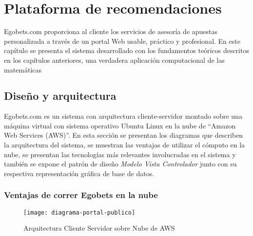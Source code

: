 \chapter{Plataforma de recomendaciones}
\label{chap:software}
\graphicspath{{/Users/brunomedina/Dropbox/Tesis-Egobets/egobets-notas/resources/diagramas/}}

Egobets.com proporciona al cliente los servicios de asesoría de apuestas personalizada a través de un portal Web usable, práctico y profesional. En este capítulo se presenta el sistema desarrollado con los fundamentos teóricos descritos en los capítulos anteriores, una verdadera aplicación computacional de las matemáticas





\section{Diseño y arquitectura}
\label{sec:design}
Egobets.com es un sistema con arquitectura cliente-servidor montado sobre una máquina virtual con sistema operativo Ubuntu Linux en la nube de ``Amazon Web Services (AWS)''. En esta sección se presentan los diagramas que describen la arquitectura del sistema, se muestran las ventajas de utilizar el cómputo en la nube, se presentan las tecnologías más relevantes involucradas en el sistema y también se expone el patrón de diseño \textit{Modelo Vista Controlador} junto con su respectiva representación gráfica de base de datos.
\subsection{Ventajas de correr Egobets en la nube}
\begin{figure}[!htb]\centering
   \begin {minipage}{1\textwidth}
     \texttt{[image: diagrama-portal-publico]}
     \caption{Arquitectura Cliente Servidor sobre Nube de AWS}\label{Fig:diagrama-portal-publico}
   \end{minipage}
\end{figure}

